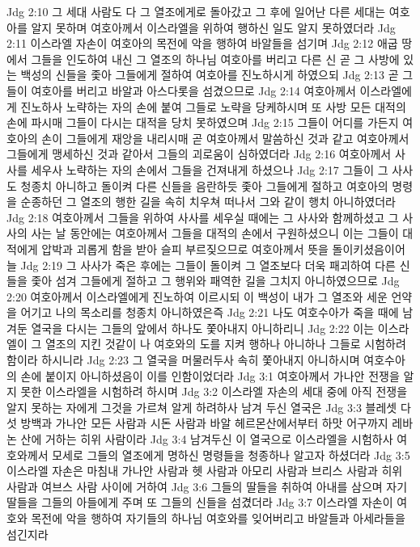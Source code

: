 Jdg 2:10  그 세대 사람도 다 그 열조에게로 돌아갔고 그 후에 일어난 다른 세대는 여호아를 알지 못하며 여호아께서 이스라엘을 위하여 행하신 일도 알지 못하였더라
Jdg 2:11  이스라엘 자손이 여호아의 목전에 악을 행하여 바알들을 섬기며
Jdg 2:12  애굽 땅에서 그들을 인도하여 내신 그 열조의 하나님 여호아를 버리고 다른 신 곧 그 사방에 있는 백성의 신들을 좇아 그들에게 절하여 여호아를 진노하시게 하였으되
Jdg 2:13  곧 그들이 여호아를 버리고 바알과 아스다롯을 섬겼으므로
Jdg 2:14  여호아께서 이스라엘에게 진노하사 노략하는 자의 손에 붙여 그들로 노략을 당케하시며 또 사방 모든 대적의 손에 파시매 그들이 다시는 대적을 당치 못하였으며
Jdg 2:15  그들이 어디를 가든지 여호아의 손이 그들에게 재앙을 내리시매 곧 여호아께서 말씀하신 것과 같고 여호아께서 그들에게 맹세하신 것과 같아서 그들의 괴로움이 심하였더라
Jdg 2:16  여호아께서 사사를 세우사 노략하는 자의 손에서 그들을 건져내게 하셨으나
Jdg 2:17  그들이 그 사사도 청종치 아니하고 돌이켜 다른 신들을 음란하듯 좇아 그들에게 절하고 여호아의 명령을 순종하던 그 열조의 행한 길을 속히 치우쳐 떠나서 그와 같이 행치 아니하였더라
Jdg 2:18  여호아께서 그들을 위하여 사사를 세우실 때에는 그 사사와 함께하셨고 그 사사의 사는 날 동안에는 여호아께서 그들을 대적의 손에서 구원하셨으니 이는 그들이 대적에게 압박과 괴롭게 함을 받아 슬피 부르짖으므로 여호아께서 뜻을 돌이키셨음이어늘
Jdg 2:19  그 사사가 죽은 후에는 그들이 돌이켜 그 열조보다 더욱 패괴하여 다른 신들을 좇아 섬겨 그들에게 절하고 그 행위와 패역한 길을 그치지 아니하였으므로
Jdg 2:20  여호아께서 이스라엘에게 진노하여 이르시되 이 백성이 내가 그 열조와 세운 언약을 어기고 나의 목소리를 청종치 아니하였은즉
Jdg 2:21  나도 여호수아가 죽을 때에 남겨둔 열국을 다시는 그들의 앞에서 하나도 쫓아내지 아니하리니
Jdg 2:22  이는 이스라엘이 그 열조의 지킨 것같이 나 여호와의 도를 지켜 행하나 아니하나 그들로 시험하려 함이라 하시니라
Jdg 2:23  그 열국을 머물러두사 속히 쫓아내지 아니하시며 여호수아의 손에 붙이지 아니하셨음이 이를 인함이었더라
Jdg 3:1  여호아께서 가나안 전쟁을 알지 못한 이스라엘을 시험하려 하시며
Jdg 3:2  이스라엘 자손의 세대 중에 아직 전쟁을 알지 못하는 자에게 그것을 가르쳐 알게 하려하사 남겨 두신 열국은
Jdg 3:3  블레셋 다섯 방백과 가나안 모든 사람과 시돈 사람과 바알 헤르몬산에서부터 하맛 어구까지 레바논 산에 거하는 히위 사람이라
Jdg 3:4  남겨두신 이 열국으로 이스라엘을 시험하사 여호와께서 모세로 그들의 열조에게 명하신 명령들을 청종하나 알고자 하셨더라
Jdg 3:5  이스라엘 자손은 마침내 가나안 사람과 헷 사람과 아모리 사람과 브리스 사람과 히위 사람과 여브스 사람 사이에 거하여
Jdg 3:6  그들의 딸들을 취하여 아내를 삼으며 자기 딸들을 그들의 아들에게 주며 또 그들의 신들을 섬겼더라
Jdg 3:7  이스라엘 자손이 여호와 목전에 악을 행하여 자기들의 하나님 여호와를 잊어버리고 바알들과 아세라들을 섬긴지라
